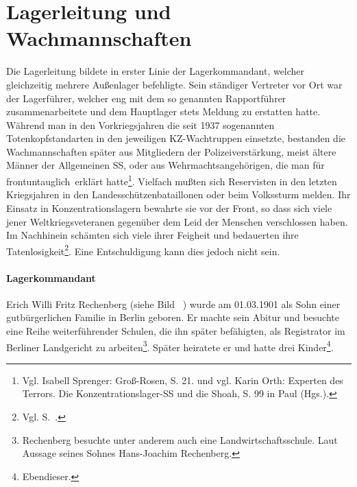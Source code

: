 \section{Lagerleitung und Wachmannschaften}
Die Lagerleitung bildete in erster Linie der Lagerkommandant, welcher gleichzeitig mehrere Außenlager befehligte. Sein ständiger Vertreter vor Ort war der Lagerführer, welcher eng mit dem so genannten Rapportführer zusammenarbeitete und dem Hauptlager stets Meldung zu erstatten hatte.
~\newline
Während man in den Vorkriegsjahren die seit 1937 sogenannten Totenkopfstandarten in den jeweiligen KZ-Wachtruppen einsetzte, bestanden die Wachmannschaften später aus Mitgliedern der Polizeiverstärkung, meist ältere Männer der Allgemeinen SS, oder aus Wehrmachtsangehörigen, die man für \glqq frontuntauglich\grqq~erklärt hatte\footnote{Vgl. Isabell Sprenger: Groß-Rosen, S. 21. und vgl. Karin Orth: \glqq Experten des Terrors. Die Konzentrationslager-SS und die Shoah\grqq, S. 99 in Paul (Hgs.).}. Vielfach mußten sich Reservisten in den letzten Kriegsjahren in den Landesschützenbataillonen oder beim Volkssturm melden. Ihr Einsatz in Konzentrationslagern bewahrte sie vor der Front, so dass sich viele jener Weltkriegsveteranen gegenüber dem Leid der Menschen verschlossen haben. Im Nachhinein schämten sich viele ihrer Feigheit und bedauerten ihre Tatenlosigkeit\footnote{Vgl. S.~\pageref{kotter}.}. Eine Entschuldigung kann dies jedoch nicht sein.\newline

\paragraph{Lagerkommandant}
Erich Willi Fritz Rechenberg (siehe Bild ~) wurde am 01.03.1901 als Sohn einer gutbürgerlichen Familie in Berlin geboren. Er machte sein Abitur und besuchte eine Reihe weiterführender Schulen, die ihn später befähigten, als Registrator im Berliner Landgericht zu arbeiten\footnote{Rechenberg besuchte unter anderem auch eine Landwirtschaftsschule. Laut Aussage seines Sohnes Hans-Joachim Rechenberg.}. Später heiratete er und hatte drei Kinder\footnote{Ebendieser.}.



